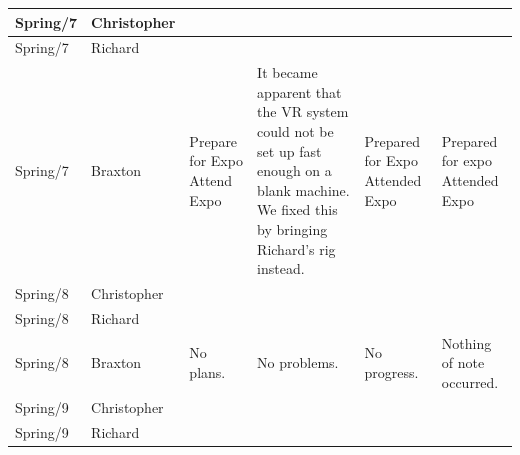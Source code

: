 \documentclass[onecolumn, draftclsnofoot,10pt, compsoc]{IEEEtran}
\begin{document}
\begin{tiny}
\begin{longtable}{ | p{} | p{} | p{} | p{} | p{} | p{} | }
\\ \hline
Spring/7 & Christopher & 

&

&

&

\\ \hline
Spring/7 & Richard & 

&

&

&

\\ \hline
Spring/7 & Braxton & 

Prepare for Expo \newline
Attend Expo 

&

It became apparent that the VR system could not be set up fast enough on a blank machine. We fixed this by bringing Richard's rig instead. 

&

Prepared for Expo 
Attended Expo 

&

Prepared for expo 
Attended Expo 

\\ \hline
Spring/8 & Christopher & 

&

&

&

\\ \hline
Spring/8 & Richard & 

&

&

&

\\ \hline
Spring/8 & Braxton & 

No plans.

&

No problems.

&

No progress.

&

Nothing of note occurred.

\\ \hline
Spring/9 & Christopher & 

&

&

&

\\ \hline
Spring/9 & Richard & 

&

&

&


\end{longtable}
\end{tiny}
\end{document}
